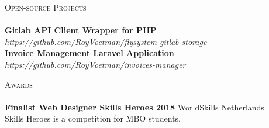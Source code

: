 \documentclass[a4paper]{article}
\newcommand{\lineunder} {
    \vspace*{-8pt} \\
    \hspace*{-18pt} \hrulefill \\
}
\newcommand{\header} [1] {
    {\hspace*{-18pt}\vspace*{6pt} \textsc{#1}}
    \vspace*{-6pt} \lineunder
}
\begin{document}
\vspace{5mm}

\header{Open-source Projects}
{\textbf{Gitlab API Client Wrapper for PHP}} \\ \emph{https://github.com/RoyVoetman/flysystem-gitlab-storage}\\
\vspace*{2mm}
{\textbf{Invoice Management Laravel Application}} \\ \emph{https://github.com/RoyVoetman/invoices-manager}\\
\vspace*{2mm}

\vspace{5mm}

\header{Awards}
\textbf{Finalist Web Designer Skills Heroes 2018} \hfill WorldSkills Netherlands\\
Skills Heroes is a competition for MBO students.
\vspace*{2mm}

\ 
\end{document}
